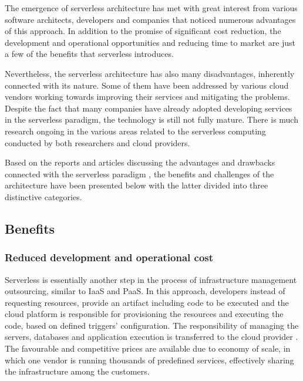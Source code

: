 The emergence of serverless architecture has met with great interest from various software architects, developers and companies that noticed numerous advantages of this approach. In addition to the promise of significant cost reduction, the development and operational opportunities and reducing time to market are just a few of the benefits that serverless introduces.

Nevertheless, the serverless architecture has also many disadvantages, inherently connected with its nature. Some of them have been addressed by various cloud vendors working towards improving their services and mitigating the problems. Despite the fact that many companies have already adopted developing services in the serverless paradigm, the technology is still not fully mature. There is much research ongoing in the various areas related to the serverless computing conducted by both researchers and cloud providers.

Based on the reports and articles discussing the advantages and drawbacks connected with the serverless paradigm \cite{MartinFowlerServerless} \cite{BerkeleyServerless} \cite{ServerlessComputingSurveyOfOpportunitiesChallengesApplications} \cite{LeveragingServerlessCloudComputingArchitectures}, the benefits and challenges of the architecture have been presented below with the latter divided into three distinctive categories.

\subsection{Benefits}

\subsubsection{Reduced development and operational cost} \label{chapter:serverless-reduced-development-and-operational-cost}

Serverless is essentially another step in the process of infrastructure management outsourcing, similar to IaaS and PaaS. In this approach, developers instead of requesting resources, provide an artifact including code to be executed and the cloud platform is responsible for provisioning the resources and executing the code, based on defined triggers' configuration. The responsibility of managing the servers, databases and application execution is transferred to the cloud provider \cite{BerkeleyServerless}. The favourable and competitive prices are available due to economy of scale, in which one vendor is running thousands of predefined services, effectively sharing the infrastructure among the customers.


